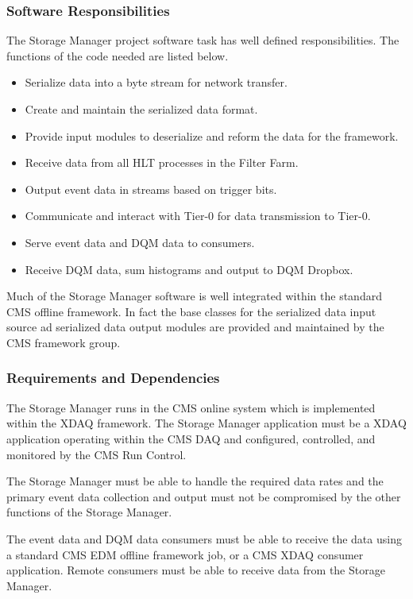 \subsubsection{Software Responsibilities}

The Storage Manager project software task has well defined  responsibilities. The
functions of the code needed are listed below. 

\begin{itemize}
\item Serialize data into a byte stream for network transfer.
\item Create and maintain the serialized data format.
\item Provide input modules to deserialize and reform the data for the framework.
\item Receive data from all HLT processes in the Filter Farm.
\item Output event data in streams based on trigger bits.
\item Communicate and interact with Tier-0 for data transmission to Tier-0.
\item Serve event data and DQM data to consumers.
\item Receive DQM data, sum histograms and output to DQM Dropbox.
\end{itemize}

Much of the Storage Manager software is well integrated within the standard
CMS offline framework. In fact the base classes for the serialized data input
source ad serialized data output modules are provided and maintained by the
CMS framework group.

\subsubsection{Requirements and Dependencies}

The Storage Manager runs in the CMS online system which is implemented within
the XDAQ framework. The Storage Manager application must be a XDAQ application
operating within the CMS DAQ and configured, controlled, and monitored by the
CMS Run Control.

The Storage Manager must be able to handle the required data rates and the
primary event data collection and output must not be compromised by the other
functions of the Storage Manager.

The event data and DQM data consumers must be able to receive the data using a
standard CMS EDM offline framework job, or a CMS XDAQ consumer application.
Remote consumers must be able to receive data from the Storage Manager.

